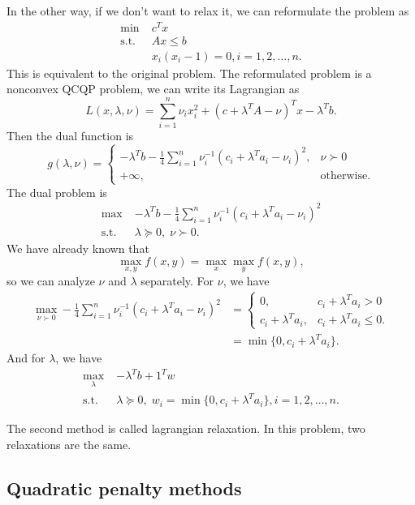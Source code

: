 \documentclass[lang=en,color=blue,mode=fancy,titlestyle=hang]{elegantbook}
\begin{document}
In the other way, if we don't want to relax it, we can reformulate the problem as
\begin{align*}
\min \; &c^T x\\
\text{s.t.} \; &Ax \leq b\\
&x_i (x_i - 1) = 0, i = 1, 2, \ldots, n.
\end{align*}
This is equivalent to the original problem. The reformulated problem is a nonconvex QCQP problem,
we can write its Lagrangian as
\[
L(x, \lambda, \nu) = \sum_{i=1}^n \nu_i x_i^2 + (c + \lambda^T A - \nu)^T x - \lambda^T b.
\]
Then the dual function is
\[
g(\lambda, \nu) = \begin{cases}
- \lambda^T b - \frac14 \sum_{i=1}^n \nu_i^{-1} (c_i + \lambda^T a_i - \nu_i)^2, & \nu \succ 0\\
+ \infty, & \text{otherwise}.
\end{cases}
\]
The dual problem is
\begin{align*}
\max \; &- \lambda^T b - \frac14 \sum_{i=1}^n \nu_i^{-1} (c_i + \lambda^T a_i - \nu_i)^2\\
\text{s.t.} \; &\lambda \succeq 0, \; \nu \succ 0.
\end{align*}
We have already known that
\[
\max_{x, y}f(x, y) = \max_x \max_y f(x, y),
\]
so we can analyze $\nu$ and $\lambda$ separately. For $\nu$, we have
\begin{align*}
\max_{\nu \succ 0} - \frac14 \sum_{i=1}^n \nu_i^{-1} (c_i + \lambda^T a_i - \nu_i)^2 &= \begin{cases}
0, & c_i + \lambda^T a_i > 0\\
c_i + \lambda^T a_i, & c_i + \lambda^T a_i \leq 0.
\end{cases}\\
&= \min\{0, c_i + \lambda^T a_i\}.
\end{align*}
And for $\lambda$, we have
\begin{align*}
\max_{\lambda} \; &-\lambda^T b + 1^T w\\
\text{s.t.} \; &\lambda \succeq 0, \; w_i = \min\{0, c_i + \lambda^T a_i\}, i = 1, 2, \ldots, n.
\end{align*}

The second method is called lagrangian relaxation. In this problem, two relaxations are the same.

\subsection{Quadratic penalty methods}
\end{document}
